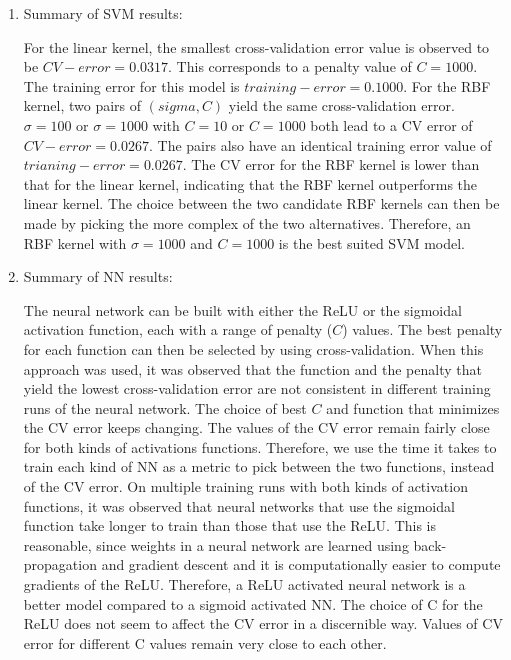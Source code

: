 \documentclass[english]{article}
\begin{document}
\begin{enumerate}

    \item Summary of SVM results:

    	For the linear kernel, the smallest cross-validation error value is observed to be $CV-error = 0.0317$. This corresponds to a penalty value of  $C = 1000$. The training error for this model is $training-error = 0.1000$. For the RBF kernel, two pairs of $(sigma, C)$ yield the same cross-validation error. $\sigma = 100$ or $\sigma = 1000$ with $C = 10$ or $C = 1000$ both lead to a CV error of $CV-error = 0.0267$. The pairs also have an identical training error value of $trianing-error = 0.0267$. The CV error for the RBF kernel is lower than that for the linear kernel, indicating that the RBF kernel outperforms the linear kernel. The choice between the two candidate RBF kernels can then be made by picking the more complex of the two alternatives. Therefore, an RBF kernel with $\sigma = 1000$ and $C = 1000$ is the best suited SVM model. 


    \item Summary of NN results: 

    	The neural network can be built with either the ReLU or the sigmoidal activation function, each with a range of penalty ($C$) values. The best penalty for each function can then be selected by using cross-validation. When this approach was used, it was observed that the function and the penalty that yield the lowest cross-validation error are not consistent in different training runs of the neural network. The choice of best $C$ and function that minimizes the CV error keeps changing. The values of the CV error remain fairly close for both kinds of activations functions. Therefore, we use the time it takes to train each kind of NN as a metric to pick between the two functions, instead of the CV error. On multiple training runs with both kinds of activation functions, it was observed that neural networks that use the sigmoidal function take longer to train than those that use the ReLU. This is reasonable, since weights in a neural network are learned using back-propagation and gradient descent and it is computationally easier to compute gradients of the ReLU. Therefore, a ReLU activated neural network is a better model compared to a sigmoid activated NN. The choice of C for the ReLU does not seem to affect the CV error in a discernible way. Values of CV error for different C values remain very close to each other. 


\end{enumerate}
\end{document}
